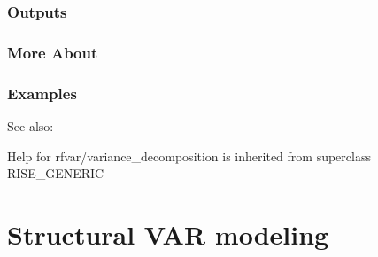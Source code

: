 \documentclass[letterpaper,10pt,english]{sphinxmanual}
\begin{document}
\subsection{Outputs}
\label{classes/models/@rfvar/rfvar:id168}

\subsection{More About}
\label{classes/models/@rfvar/rfvar:id169}

\subsection{Examples}
\label{classes/models/@rfvar/rfvar:id170}
See also:

Help for rfvar/variance\_decomposition is inherited from superclass RISE\_GENERIC


\chapter{Structural VAR modeling}
\label{classes/models/@svar/svar:structural-var-modeling}\label{classes/models/@svar/svar::doc}
\end{document}
